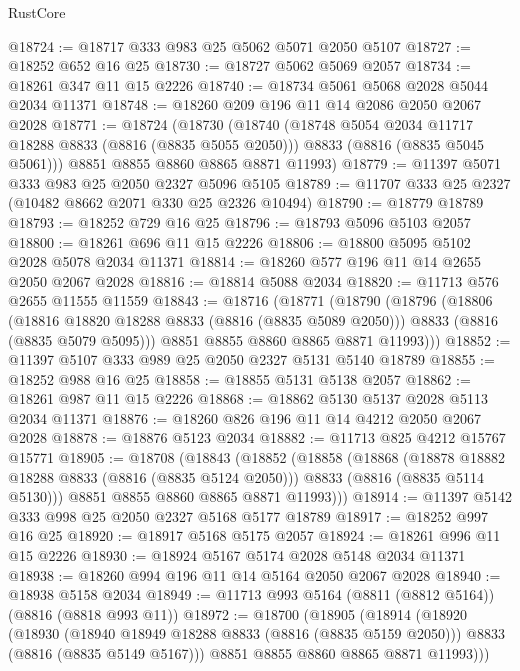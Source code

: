 \begin{lexlean}{RustCore}
\begin{coremodule}
@18724 := @18717 @333 @983 @25 @5062 @5071 @2050 @5107
@18727 := @18252 @652 @16 @25
@18730 := @18727 @5062 @5069 @2057
@18734 := @18261 @347 @11 @15 @2226
@18740 := @18734 @5061 @5068 @2028 @5044 @2034 @11371
@18748 := @18260 @209 @196 @11 @14 @2086 @2050 @2067 @2028
@18771 := @18724
    (@18730
      (@18740
        (@18748 @5054 @2034 @11717 @18288 @8833 (@8816 (@8835 @5055 @2050)))
        @8833
        (@8816 (@8835 @5045 @5061)))
      @8851
      @8855
      @8860
      @8865
      @8871
      @11993)
@18779 := @11397 @5071 @333 @983 @25 @2050 @2327 @5096 @5105
@18789 := @11707 @333 @25 @2327 (@10482 @8662 @2071 @330 @25 @2326 @10494)
@18790 := @18779 @18789
@18793 := @18252 @729 @16 @25
@18796 := @18793 @5096 @5103 @2057
@18800 := @18261 @696 @11 @15 @2226
@18806 := @18800 @5095 @5102 @2028 @5078 @2034 @11371
@18814 := @18260 @577 @196 @11 @14 @2655 @2050 @2067 @2028
@18816 := @18814 @5088 @2034
@18820 := @11713 @576 @2655 @11555 @11559
@18843 := @18716
    (@18771
      (@18790
        (@18796
          (@18806
            (@18816 @18820 @18288 @8833 (@8816 (@8835 @5089 @2050)))
            @8833
            (@8816 (@8835 @5079 @5095)))
          @8851
          @8855
          @8860
          @8865
          @8871
          @11993)))
@18852 := @11397 @5107 @333 @989 @25 @2050 @2327 @5131 @5140 @18789
@18855 := @18252 @988 @16 @25
@18858 := @18855 @5131 @5138 @2057
@18862 := @18261 @987 @11 @15 @2226
@18868 := @18862 @5130 @5137 @2028 @5113 @2034 @11371
@18876 := @18260 @826 @196 @11 @14 @4212 @2050 @2067 @2028
@18878 := @18876 @5123 @2034
@18882 := @11713 @825 @4212 @15767 @15771
@18905 := @18708
    (@18843
      (@18852
        (@18858
          (@18868
            (@18878 @18882 @18288 @8833 (@8816 (@8835 @5124 @2050)))
            @8833
            (@8816 (@8835 @5114 @5130)))
          @8851
          @8855
          @8860
          @8865
          @8871
          @11993)))
@18914 := @11397 @5142 @333 @998 @25 @2050 @2327 @5168 @5177 @18789
@18917 := @18252 @997 @16 @25
@18920 := @18917 @5168 @5175 @2057
@18924 := @18261 @996 @11 @15 @2226
@18930 := @18924 @5167 @5174 @2028 @5148 @2034 @11371
@18938 := @18260 @994 @196 @11 @14 @5164 @2050 @2067 @2028
@18940 := @18938 @5158 @2034
@18949 := @11713 @993 @5164 (@8811 (@8812 @5164)) (@8816 (@8818 @993 @11))
@18972 := @18700
    (@18905
      (@18914
        (@18920
          (@18930
            (@18940 @18949 @18288 @8833 (@8816 (@8835 @5159 @2050)))
            @8833
            (@8816 (@8835 @5149 @5167)))
          @8851
          @8855
          @8860
          @8865
          @8871
          @11993)))

\end{coremodule}
\end{lexlean}
